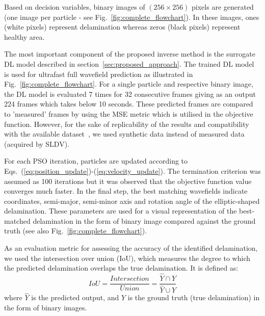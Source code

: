 Based on decision variables, binary images of $(256\times256)$ pixels are generated (one image per particle - see Fig.~\ref{fig:complete_flowchart}).
In these images, ones (white pixels) represent delamination whereas zeros (black pixels) represent healthy area.

The most important component of the proposed inverse method is the surrogate DL model described in section~\ref{sec:proposed_approach}.
The trained DL model is used for ultrafast full wavefield prediction as illustrated in Fig.~\ref{fig:complete_flowchart}.
For a single particle and respective binary image, the DL model is evaluated 7 times for 32 consecutive frames giving as an output 224 frames which takes below 10 seconds. 
These predicted frames are compared to 'measured' frames by using the MSE metric which is utilised in the objective function.
However, for the sake of replicability of the results and compatibility with the available dataset~\cite{kudela_pawel_2021_5414555}, we used synthetic data instead of measured data (acquired by SLDV).

For each PSO iteration, particles are updated according to Eqs.~(\ref{eq:position_update})-(\ref{eq:velocity_update}).
The termination criterion was assumed as 100 iterations but it was observed that the objective function value converges much faster.
In the final step, the best matching wavefields indicate coordinates, semi-major, semi-minor axis and rotation angle of the elliptic-shaped delamination. 
These parameters are used for a visual representation of the best-matched delamination in the form of binary image compared against the ground truth (see also Fig.~\ref{fig:complete_flowchart}).

As an evaluation metric for assessing the accuracy of the identified 
delamination, we used the intersection over union (IoU), which measures the 
degree to which the predicted delamination overlaps the true delamination. 
It is defined as:
\begin{equation}
	IoU=\frac{Intersection}{Union}=\frac{\hat{Y} \cap Y}{\hat{Y} \cup Y}
	\label{eq:iou}
\end{equation}
where \(\hat{Y}\) is the predicted output, and \(Y\) is the ground truth (true delamination) in the form of binary images.
